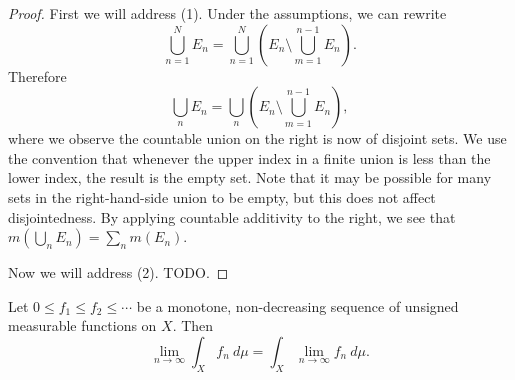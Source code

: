 \documentclass[12pt]{article}
\begin{document}
\begin{proof}
	First we will address (1). Under the assumptions, we can rewrite 
	\begin{equation*}
		\bigcup_{n=1}^N E_n = \bigcup_{n=1}^N \left(E_n\setminus\bigcup_{m=1}^{n-1}E_n\right).
	\end{equation*}
	Therefore
	\begin{equation*}
		\bigcup_n E_n = \bigcup_n\left(E_n\setminus\bigcup_{m=1}^{n-1}E_n\right),
	\end{equation*}
	where we observe the countable union on the right is now of disjoint sets. We use the convention that whenever the upper index in a finite union is less than the lower index, the result is the empty set. Note that it may be possible for many sets in the right-hand-side union to be empty, but this does not affect disjointedness. By applying countable additivity to the right, we see that $m(\bigcup_n E_n)=\sum_n m(E_n)$. 

	Now we will address (2). TODO.
\end{proof}

\begin{theorem}
	Let $0\leq f_1\leq f_2\leq\cdots$ be a monotone, non-decreasing sequence of unsigned measurable functions on $X$. Then 
	\begin{equation*}
		\lim_{n\to\infty}\int_X f_n\ d\mu = \int_{X}\lim_{n\to\infty}f_n\ d\mu.
	\end{equation*}
\end{theorem}
\end{document}
